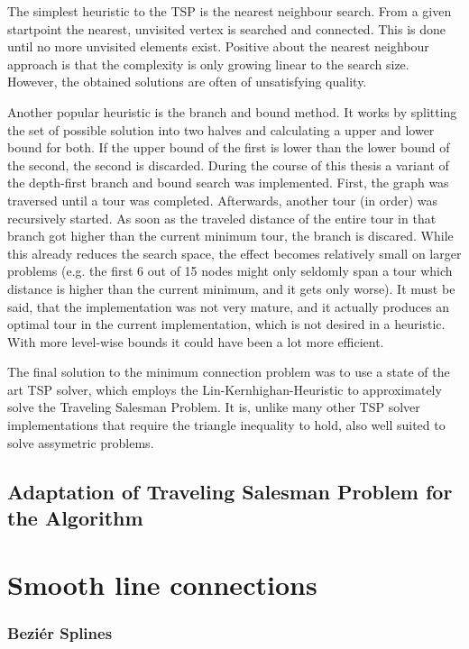\documentclass[10pt,twoside,a4paper]{report}
\begin{document}
The simplest heuristic to the TSP is the nearest neighbour search. From a given startpoint the nearest, unvisited vertex is searched and connected. This is done until no more unvisited elements exist. Positive about the nearest neighbour approach is that the complexity is only growing linear to the search size. However, the obtained solutions are often of unsatisfying quality.

Another popular heuristic is the branch and bound method. It works by splitting the set of possible solution into two halves and calculating a upper and lower bound for both. If the upper bound of the first is lower than the lower bound of the second, the second is discarded. During the course of this thesis a variant of the depth-first branch and bound search was implemented. First, the graph was traversed until a tour was completed. Afterwards, another tour (in order) was recursively started. As soon as the traveled distance of the entire tour in that branch got higher than the current minimum tour, the branch is discared. While this already reduces the search space, the effect becomes relatively small on larger problems (e.g. the first 6 out of 15 nodes might only seldomly span a tour which distance is higher than the current minimum, and it gets only worse).  It must be said, that the implementation was not very mature, and it actually produces an optimal tour in the current implementation, which is not desired in a heuristic. With more level-wise bounds it could have been a lot more efficient. 

The final solution to the minimum connection problem was to use a state of the art TSP solver\cite{helsgaun2000effective}, which employs the Lin-Kernhighan-Heuristic\cite{kernighan1970efficient} to approximately solve the Traveling Salesman Problem. It is, unlike many other TSP solver implementations that require the triangle inequality to hold, also well suited to solve assymetric problems.
\subsection{Adaptation of Traveling Salesman Problem for the Algorithm}



\section{Smooth line connections}
\subsubsection{Beziér Splines}
\end{document}

